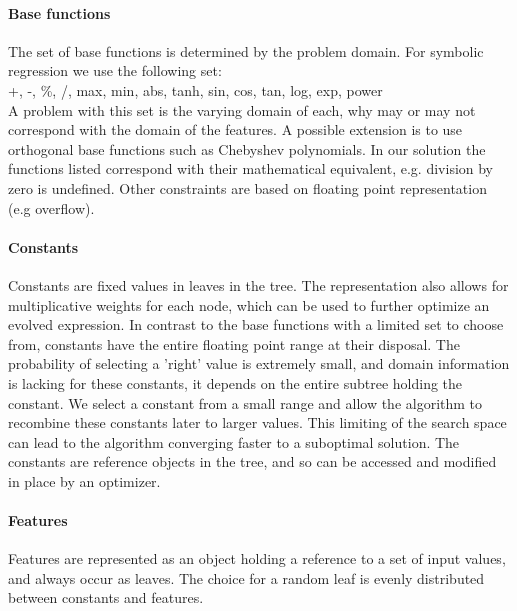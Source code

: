 \paragraph{Base functions}
The set of base functions is determined by the problem domain. For symbolic regression we use the following set:\\
+, -, \%, /, max, min, abs, tanh, sin, cos, tan, log, exp, power\\
A problem with this set is the varying domain of each, why may or may not correspond with the domain of the features. A possible extension is to use orthogonal base functions such as Chebyshev polynomials. In our solution the functions listed correspond with their mathematical equivalent, e.g. division by zero is undefined. Other constraints are based on floating point representation (e.g overflow).

\paragraph{Constants}
Constants are fixed values in leaves in the tree. The representation also allows for multiplicative weights for each node, which can be used to further optimize an evolved expression. In contrast to the base functions with a limited set to choose from, constants have the entire floating point range at their disposal. The probability of selecting a 'right' value is extremely small, and domain information is lacking for these constants, it depends on the entire subtree holding the constant. We select a constant from a small range and allow the algorithm to recombine these constants later to larger values. This limiting of the search space can lead to the algorithm converging faster to a suboptimal solution.
The constants are reference objects in the tree, and so can be accessed and modified in place by an optimizer.

\paragraph{Features}
Features are represented as an object holding a reference to a set of input values, and always occur as leaves. The choice for a random leaf is evenly distributed between constants and features.

